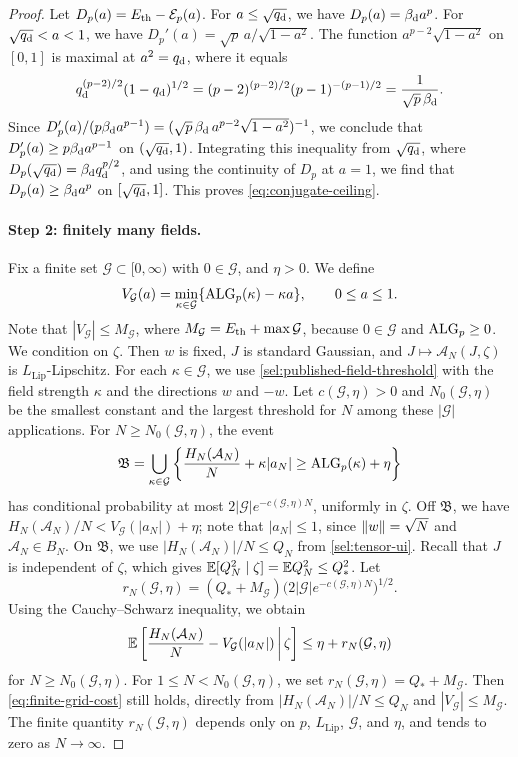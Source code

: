\begin{proof}
Let $D_p(a)=E_{\mathrm{th}}-\mathcal E_p(a)$. For $a\le\sqrt{q_{\mathrm d}}$, we have
$D_p(a)=\beta_{\mathrm d} a^p$. For $\sqrt{q_{\mathrm d}}<a<1$, we have
$D_p'(a)=\sqrt p\,a/\sqrt{1-a^2}$. The function $a^{p-2}\sqrt{1-a^2}$ on
$[0,1]$ is maximal at $a^2=q_{\mathrm d}$, where it equals
\[
 q_{\mathrm d}^{(p-2)/2}(1-q_{\mathrm d})^{1/2}=(p-2)^{(p-2)/2}(p-1)^{-(p-1)/2}
 =\frac{1}{\sqrt p\,\beta_{\mathrm d}}.
\]
Since $D_p'(a)/(p\beta_{\mathrm d} a^{p-1})=(\sqrt p\,\beta_{\mathrm d}\,a^{p-2}\sqrt{1-a^2})^{-1}$, we conclude that $D_p'(a)\ge p\beta_{\mathrm d} a^{p-1}$ on $(\sqrt{q_{\mathrm d}},1)$. Integrating this
inequality from $\sqrt{q_{\mathrm d}}$, where $D_p(\sqrt{q_{\mathrm d}})=\beta_{\mathrm d}q_{\mathrm d}^{p/2}$, and
using the continuity of $D_p$ at $a=1$, we find that $D_p(a)\ge\beta_{\mathrm d} a^p$ on
$[\sqrt{q_{\mathrm d}},1]$. This proves \eqref{eq:conjugate-ceiling}.

\paragraph{Step 2: finitely many fields.}
Fix a finite set $\mathcal G\subset[0,\infty)$ with $0\in\mathcal G$, and
$\eta>0$. We define
\[
 V_{\mathcal G}(a)=\min_{\kappa\in\mathcal G}\{\operatorname{ALG}_p(\kappa)-\kappa a\},
 \qquad 0\le a\le1.
\]
Note that $|V_{\mathcal G}|\le M_{\mathcal G}$, where
$M_{\mathcal G}=E_{\mathrm{th}}+\max\mathcal G$, because $0\in\mathcal G$ and
$\operatorname{ALG}_p\ge0$. We condition on $\zeta$. Then $w$ is
fixed, $J$ is standard Gaussian, and $J\mapsto\mathcal A_N(J,\zeta)$ is
$L_{\mathrm{Lip}}$-Lipschitz. For each $\kappa\in\mathcal G$, we use
\cref{sel:published-field-threshold} with the field strength $\kappa$ and the
directions $w$ and $-w$. Let $c(\mathcal G,\eta)>0$ and $N_0(\mathcal G,\eta)$
be the smallest constant and the largest threshold for $N$ among these
$|\mathcal G|$ applications. For $N\ge N_0(\mathcal G,\eta)$, the event
\[
 \mathfrak B=\bigcup_{\kappa\in\mathcal G}\left\{
 \frac{H_N(\mathcal A_N)}N+\kappa|a_N|\ge\operatorname{ALG}_p(\kappa)+\eta\right\}
\]
has conditional probability at most $2|\mathcal G|e^{-c(\mathcal G,\eta)N}$,
uniformly in $\zeta$. Off $\mathfrak B$, we have
$H_N(\mathcal A_N)/N<V_{\mathcal G}(|a_N|)+\eta$; note that $|a_N|\le1$,
since $\lVert w\rVert=\sqrt N$ and $\mathcal A_N\in B_N$. On $\mathfrak B$, we use
$|H_N(\mathcal A_N)|/N\le Q_N$ from \eqref{sel:tensor-ui}. Recall that $J$ is
independent of $\zeta$, which gives $\mathbb E[Q_N^2\mid\zeta]=\mathbb E Q_N^2\le Q_*^2$.
Let
\[
 r_N(\mathcal G,\eta)=(Q_*+M_{\mathcal G})
 \big(2|\mathcal G|e^{-c(\mathcal G,\eta)N}\big)^{1/2}.
\]
Using the Cauchy--Schwarz inequality, we obtain
\begin{equation}\label{eq:finite-grid-cost}
 \mathbb E\left[\frac{H_N(\mathcal A_N)}N-V_{\mathcal G}(|a_N|)\,\middle|\,\zeta\right]
 \le\eta+r_N(\mathcal G,\eta)
\end{equation}
for $N\ge N_0(\mathcal G,\eta)$. For $1\le N<N_0(\mathcal G,\eta)$, we set
$r_N(\mathcal G,\eta)=Q_*+M_{\mathcal G}$. Then
\eqref{eq:finite-grid-cost} still holds, directly from
$|H_N(\mathcal A_N)|/N\le Q_N$ and $|V_{\mathcal G}|\le M_{\mathcal G}$.
The finite quantity $r_N(\mathcal G,\eta)$ depends only on $p$, $L_{\mathrm{Lip}}$, $\mathcal G$, and $\eta$, and tends to zero as $N\to\infty$.


\end{proof}
